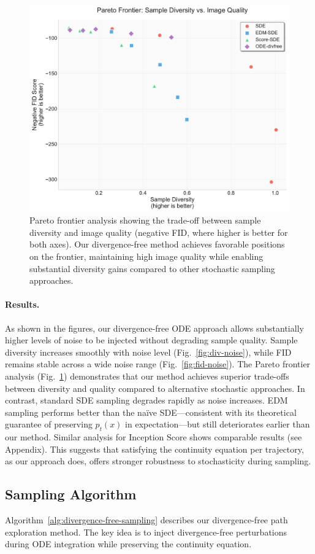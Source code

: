 \documentclass{article}
\begin{document}
\begin{figure}[H]
  \centering
  \includegraphics[width=0.7\linewidth]{figures/pareto_diversity_vs_fid.pdf}
  \caption{Pareto frontier analysis showing the trade-off between sample diversity and image quality (negative FID, where higher is better for both axes). Our divergence-free method achieves favorable positions on the frontier, maintaining high image quality while enabling substantial diversity gains compared to other stochastic sampling approaches.}
  \label{fig:pareto-fid}
\end{figure}

\paragraph{Results.}
As shown in the figures, our divergence-free ODE approach allows substantially higher levels of noise to be injected without degrading sample quality. Sample diversity increases smoothly with noise level (Fig.~\ref{fig:div-noise}), while FID remains stable across a wide noise range (Fig.~\ref{fig:fid-noise}). The Pareto frontier analysis (Fig.~\ref{fig:pareto-fid}) demonstrates that our method achieves superior trade-offs between diversity and quality compared to alternative stochastic approaches. In contrast, standard SDE sampling degrades rapidly as noise increases. EDM sampling performs better than the naïve SDE—consistent with its theoretical guarantee of preserving \(p_t(x)\) in expectation—but still deteriorates earlier than our method. Similar analysis for Inception Score shows comparable results (see Appendix). This suggests that satisfying the continuity equation per trajectory, as our approach does, offers stronger robustness to stochasticity during sampling.

\subsection{Sampling Algorithm}
Algorithm~\ref{alg:divergence-free-sampling} describes our divergence-free path exploration method. The key idea is to inject divergence-free perturbations during ODE integration while preserving the continuity equation.
\end{document}
